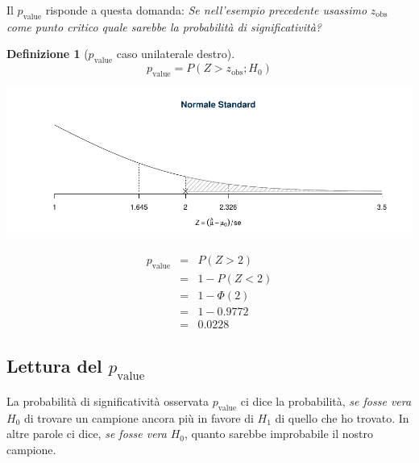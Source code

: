 \documentclass[
  11pt,
]{book}
\theoremstyle{mytheoremstyle}
\theoremstyle{mydefstyle}
\newtheorem{definition}{Definizione}[section]
\begin{document}
Il \(p_\text{value}\) risponde a questa domanda: \emph{Se nell'esempio
precedente usassimo} \(z_{\text{obs}}\) \emph{come punto critico quale sarebbe
la probabilità di significatività?}

\begin{info}

\begin{definition}[$p_\text{value}$ caso unilaterale destro]
\[p_\text{value}=P(Z>z_{\text{obs}};H_0)\]
\end{definition}

\end{info}

\begin{center}\includegraphics{Appunti_di_Statistica_2025_files/figure-latex/15-test-mu-pi-16-1} \end{center}

\begin{eqnarray*}
p_{\text{value}}&=& P(Z>2) \\
                &=& 1-P(Z<2)\\
                &=& 1-\Phi(2)\\
                &=& 1-0.9772\\
                &=& 0.0228
\end{eqnarray*}

\subsection{\texorpdfstring{Lettura del \(p_\text{value}\)}{Lettura del p\_\textbackslash text\{value\}}}\label{lettura-del-p_textvalue}

La probabilità di significatività osservata \(p_\text{value}\) ci dice la
probabilità, \emph{se fosse vera} \(H_0\) di trovare un campione ancora più in
favore di \(H_1\) di quello che ho trovato. In altre parole ci dice, \emph{se
fosse vera} \(H_0\), quanto sarebbe improbabile il nostro campione.
\end{document}
